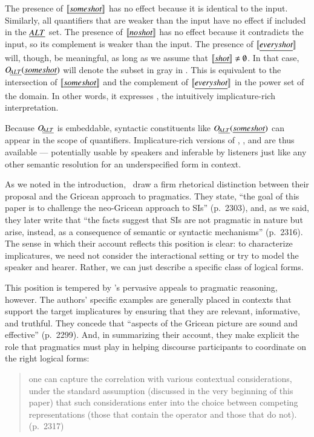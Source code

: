 \documentclass[leqno,12pt]{article}
\begin{document}
The presence of $\llbracket\emph{some shot\/}\rrbracket$ has no effect because it is
identical to the input. Similarly, all quantifiers that are weaker
than the input have no effect if included in the $\emph{ALT}$ set. The
presence of $\llbracket\emph{no shot\/}\rrbracket$ has no effect because it
contradicts the input, so its complement is weaker than the input.
The presence of $\llbracket\emph{every shot\/}\rrbracket$ will, though, be meaningful,
as long as we assume that $\llbracket\emph{shot\/}\rrbracket \neq \emptyset$.  In that
case, $\mathop{O\negthinspace_{\emph{ALT}}}(\emph{some shot\/})$ will denote the subset in gray in
.  This is equivalent to the intersection of
$\llbracket\emph{some shot\/}\rrbracket$ and the complement of
$\llbracket\emph{every shot\/}\rrbracket$ in the power set of the domain.  In other
words, it expresses , the intuitively
implicature-rich interpretation.

Because $\mathop{O\negthinspace_{\emph{ALT}}}$ is embeddable, syntactic constituents like
$\mathop{O\negthinspace_{\emph{ALT}}}(\emph{some shot})$ can appear in the scope of quantifiers.
Implicature-rich versions of , , and
 are thus available --- potentially usable by
speakers and inferable by listeners just like any other semantic
resolution for an underspecified form in context.

As we noted in the introduction, \CFS\ draw a firm rhetorical
distinction between their proposal and the Gricean approach to
pragmatics. They state, ``the goal of this paper is to challenge the
neo-Gricean approach to SIs'' (p.~2303), and, as we said, they later
write that ``the facts suggest that SIs are not pragmatic in nature
but arise, instead, as a consequence of semantic or syntactic
mechanisms'' (p.~2316). The sense in which their account reflects this
position is clear: to characterize implicatures, we need not consider
the interactional setting or try to model the speaker and
hearer. Rather, we can just describe a specific class of logical
forms.


This position is tempered by \CFS's pervasive appeals to
pragmatic reasoning, however.  The authors' specific examples are generally
placed in contexts that support the target implicatures by ensuring
that they are relevant, informative, and truthful.  They concede that
``aspects of the Gricean picture are sound and effective''
(p.~2299). And, in summarizing their account, they make explicit the
role that pragmatics must play in helping discourse
participants to coordinate on the right logical forms:
%
\begin{quote}
  one can capture the correlation with various contextual
  considerations, under the standard assumption (discussed in the very
  beginning of this paper) that such considerations enter into the
  choice between competing representations (those that contain the
  operator and those that do not). (p.~2317)
\end{quote}
\end{document}
